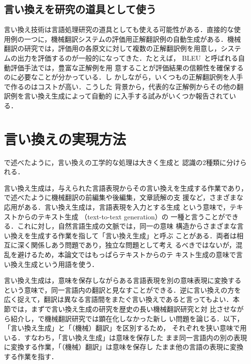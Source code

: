 \subsection{言い換えを研究の道具として使う}
\label{ssec:as_tools}

言い換え技術は言語処理研究の道具としても使える可能性がある．直接的な使
用例の一つに，機械翻訳システムの評価用正解翻訳例の自動生成がある．機械
翻訳の研究では，評価用の各原文に対して複数の正解翻訳例を用意し，システ
ムの出力を評価するのが一般的になってきた．たとえば，
BLEU~\cite{papineni:02:b}と呼ばれる自動評価手法では，豊富な正解例を用
意することが評価結果の信頼性を確保するのに必要なことが分かっている．し
かしながら，いくつもの正解翻訳例を人手で作るのはコストが高い．こうした
背景から，代表的な正解例からその他の翻訳例を言い換え生成によって自動的
に入手する試みがいくつか報告されている\cite{pang:03,kanayama:03}．

\clearpage

\section{言い換えの実現方法}
\label{sec:models}

で述べたように，言い換えの工学的な処理は大きく生成と
認識の2種類に分けられる．

言い換え生成は，与えられた言語表現からその言い換えを生成する作業であり，
で述べたように機械翻訳の前編集や後編集，文章読解の支
援など，さまざまな応用がある．言い換え生成は，言語表現を入力とする生成
という意味で，テキストからのテキスト生成 （text-to-text generation）の
一種と言うことができる．これに対し，自然言語生成の文脈では，同一の意味
構造からさまざまな言い換えを生成する作業を指して「言い換え生成」と呼ぶ
ことがある．両者は相互に深く関係しあう問題であり，独立な問題として考え
るべきではないが，混乱を避けるため，本論文ではもっぱらテキストからのテ
キスト生成の意味で言い換え生成という用語を使う．

言い換え生成は，意味を保存しながらある言語表現を別の意味表現に変換する
という意味で，同一言語内の翻訳と見なすことができる．逆に言い換えの方を
広く捉えて，翻訳は異なる言語間をまたぐ言い換えであると言ってもよい．本
節では，まずで言い換え生成の研究を歴史の長い機械翻訳研究と対
比させながら紹介し，で機械翻訳研究では顕在化しなかった新し
い問題を論じる．以下，「言い換え生成」と「（機械）翻訳」を区別するため，
それぞれを狭い意味で用いる．すなわち，「言い換え生成」は意味を保存した
まま同一言語内の別の表現に変換する作業，「（機械）翻訳」は意味を保存し
たまま他の言語の表現に変換する作業を指す．

